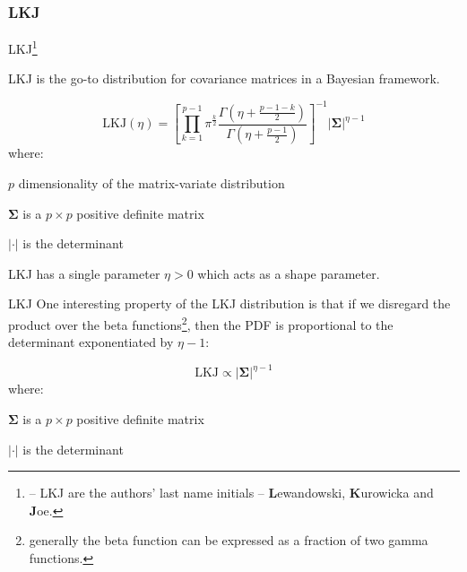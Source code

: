 \subsubsection*{LKJ}
\begin{frame}[noframenumbering]{LKJ\footnote{
			\textcite{lewandowski2009generating} --
			LKJ are the authors' last name initials -- \textbf{L}ewandowski, \textbf{K}urowicka and \textbf{J}oe.
		}}

	LKJ is the go-to distribution for covariance matrices in a Bayesian framework.

	$$
		\text{LKJ} (\eta) = \left[\prod_{k=1}^{p-1}\pi^{\frac{k}{2}}
			\frac{\Gamma\left(\eta+\frac{p-1-k}{2}\right)}{\Gamma\left(\eta+\frac{p-1}{2}\right)}\right]^{-1}
		|\boldsymbol{\Sigma}|^{\eta-1}
	$$
	where:
	\begin{vfilleditems}
		\item $p$ dimensionality of the matrix-variate distribution
		\item $\boldsymbol{\Sigma}$ is a $p \times p$ positive definite matrix
		\item $\left| \cdot \right|$ is the determinant
	\end{vfilleditems}
	\vfill
	LKJ has a single parameter $\eta > 0$ which acts as a shape parameter.
\end{frame}

\begin{frame}[noframenumbering]{LKJ}
	One interesting property of the LKJ distribution is that
	if we disregard the product over the beta functions\footnote{
		generally the beta function can be expressed as a fraction of
		two gamma functions.
	},
	then the PDF is proportional to the determinant exponentiated by $\eta - 1$:

	$$
		\text{LKJ} \propto \left|\boldsymbol{\Sigma}\right|^{\eta - 1}
	$$
	where:
	\begin{vfilleditems}
		\item $\boldsymbol{\Sigma}$ is a $p \times p$ positive definite matrix
		\item $\left| \cdot \right|$ is the determinant
	\end{vfilleditems}

\end{frame}
